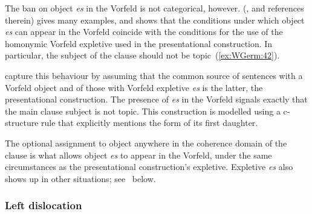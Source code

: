 \documentclass[output=paper,hidelinks]{langscibook}
\begin{document}
The ban on object \textit{es} in the Vorfeld is not categorical,
however. \citeauthor{meinunger:2007:li} (\citeyear{meinunger:2007:li}, and references therein)  gives many
examples, and shows that the conditions under which object \textit{es}
can appear in the Vorfeld coincide with the conditions for the use of
the homonymic Vorfeld expletive used in the presentational
construction. In particular, the subject of the clause should not be
topic~(\ref{ex:WGerm:42}).
%
\begin{exe}
  \ex\label{ex:WGerm:42}
  \begin{xlist}
  \end{xlist}
\end{exe}
%
\citet{theiler-bouma:2012:lfg} capture this behaviour by assuming that
the common source of sentences with a Vorfeld object and of those with
Vorfeld expletive \textit{es} is the latter, the presentational
construction. The presence of \textit{es} in the Vorfeld signals exactly that
the main clause subject is not topic. This construction is modelled using
a c-structure rule that explicitly mentions the form of its first
daughter.
%
\begin{exe}
  \ex {}
\end{exe}
The optional assignment to object anywhere in the coherence domain of the
clause is what allows object \textit{es} to appear in the
Vorfeld, under the same circumstances as the presentational
construction's expletive. Expletive \textit{es} also shows up in other
situations; see~ below.
 

\subsubsection{Left dislocation}
\end{document}
